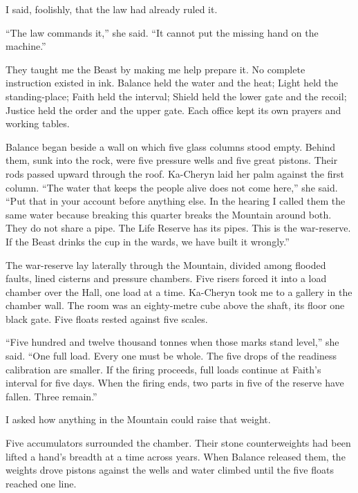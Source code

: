I said, foolishly, that the law had already ruled it.\par

``The law commands it,'' she said. ``It cannot put the missing hand on the machine.''\par

\ornament

They taught me the Beast by making me help prepare it. No complete instruction existed in ink. Balance held the water and the heat; Light held the standing-place; Faith held the interval; Shield held the lower gate and the recoil; Justice held the order and the upper gate. Each office kept its own prayers and working tables.\par

Balance began beside a wall on which five glass columns stood empty. Behind them, sunk into the rock, were five pressure wells and five great pistons. Their rods passed upward through the roof. Ka-Cheryn laid her palm against the first column. ``The water that keeps the people alive does not come here,'' she said. ``Put that in your account before anything else. In the hearing I called them the same water because breaking this quarter breaks the Mountain around both. They do not share a pipe. The Life Reserve has its pipes. This is the war-reserve. If the Beast drinks the cup in the wards, we have built it wrongly.''\par

The war-reserve lay laterally through the Mountain, divided among flooded faults, lined cisterns and pressure chambers. Five risers forced it into a load chamber over the Hall, one load at a time. Ka-Cheryn took me to a gallery in the chamber wall. The room was an eighty-metre cube above the shaft, its floor one black gate. Five floats rested against five scales.\par

``Five hundred and twelve thousand tonnes when those marks stand level,'' she said. ``One full load. Every one must be whole. The five drops of the readiness calibration are smaller. If the firing proceeds, full loads continue at Faith's interval for five days. When the firing ends, two parts in five of the reserve have fallen. Three remain.''\par

I asked how anything in the Mountain could raise that weight.\par

Five accumulators surrounded the chamber. Their stone counterweights had been lifted a hand's breadth at a time across years. When Balance released them, the weights drove pistons against the wells and water climbed until the five floats reached one line.\par

